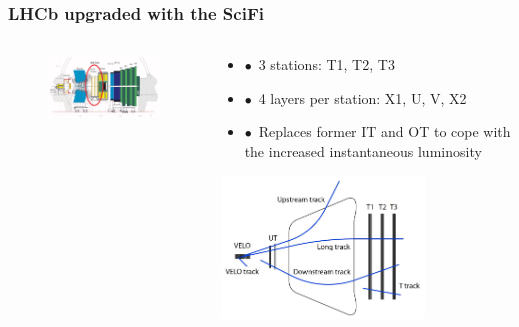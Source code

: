 \documentclass[xcolor=dvipsnames, aspectratio=1610, 12pt]{beamer}
\begin{document}
\begin{frame}\frametitle{LHCb upgraded with the SciFi}
  \begin{columns}
    \begin{column}[c]{0.48\textwidth}
      \begin{figure}
        \includegraphics[width=\textwidth]{logos/upgrade_lhcb.png}
      \end{figure}
    \end{column}
    \begin{column}{0.48\textwidth}
      \begin{itemize}
        \item $\bullet$\, 3 stations: T1, T2, T3
        \item $\bullet$\, 4 layers per station: X1, U, V, X2
      	\item $\bullet$\, Replaces former IT and OT to cope with the increased instantaneous luminosity
      \end{itemize}
      \includegraphics[width=0.7\textwidth]{plots/track.png}
    \end{column}
  \end{columns}
\end{frame}
\end{document}
